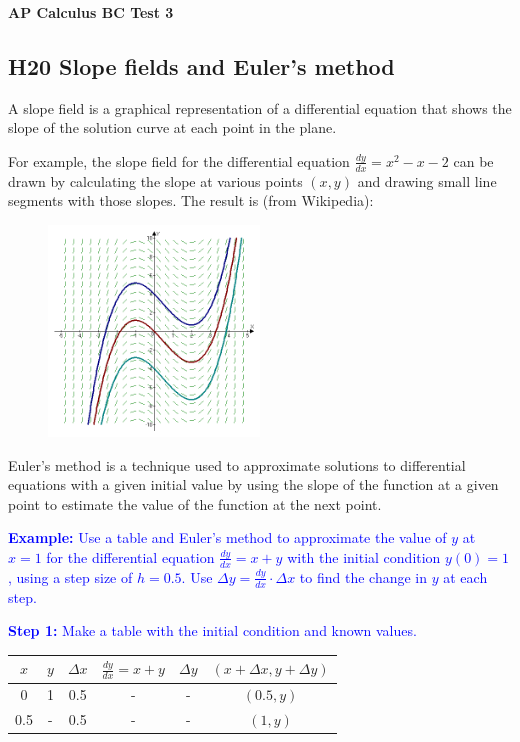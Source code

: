 \documentclass[letterpaper, 12pt]{article}
\newcommand{\example}[1]{\textcolor{blue}{\textbf{Example:} #1}}
\newcommand{\step}[2]{\textcolor{blue}{\textbf{Step #1:} #2}}
\begin{document}
\begin{center}
\textbf{{\Large AP Calculus BC Test 3}}
\end{center}

\subsection*{H20 Slope fields and Euler's method}

A slope field is a graphical representation of a differential equation that shows the slope of the solution curve at each point in the plane.

For example, the slope field for the differential equation $\displaystyle \frac{dy}{dx} = x^2 - x -2$ can be drawn by calculating the slope at various points $(x, y)$ and drawing small line segments with those slopes. The result is (from Wikipedia):

\begin{figure}[H]
\centering
\includegraphics[width=0.5\textwidth]{slopefield.png}
\end{figure}

Euler's method is a technique used to approximate solutions to differential equations with a given initial value by using the slope of the function at a given point to estimate the value of the function at the next point.

\example{Use a table and Euler's method to approximate the value of $y$ at $x=1$ for the differential equation $\displaystyle \frac{dy}{dx} = x + y$ with the initial condition $y(0) = 1$, using a step size of $h=0.5$. Use $\Delta y = \displaystyle \frac{dy}{dx} \cdot \Delta x$ to find the change in $y$ at each step.}

\step{1}{Make a table with the initial condition and known values.}

\begin{table}[H]
\centering
\begin{tabular}{|c|c|c|c|c|c|}
\hline
$x$ & $y$ & $\Delta x$ & $\frac{dy}{dx} = x + y$ & $\Delta y$ & $(x + \Delta x, y + \Delta y)$ \\
\hline
0 & 1 & 0.5 & - & - & $(0.5, y)$ \\
0.5 & - & 0.5 & - & - & $(1, y)$ \\
\hline
\end{tabular}
\end{table}
\end{document}
